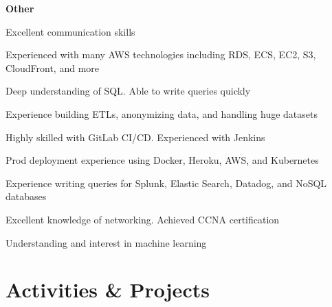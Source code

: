 \documentclass[margin,line]{resume}
\begin{document}
\begin{resume}
    \hspace{2.4mm}\textbf{Other}\vspace{1mm}
    \begin{list2}
        \item Excellent communication skills
        \item Experienced with many AWS technologies including RDS, ECS, EC2, S3, CloudFront, and more
        \item Deep understanding of SQL. Able to write queries quickly
        \item Experience building ETLs, anonymizing data, and handling huge datasets
        \item Highly skilled with GitLab CI/CD. Experienced with Jenkins
        \item Prod deployment experience using Docker, Heroku, AWS, and Kubernetes
        \item Experience writing queries for Splunk, Elastic Search, Datadog, and NoSQL databases
        \item Excellent knowledge of networking. Achieved CCNA certification
        \item Understanding and interest in machine learning
    \end{list2}\vspace{-1.5mm}

\sectionline

    \section{\mysidestyle \textbf{\large{A}\small{ctivities \& Projects}}}


\end{resume}
\end{document}
